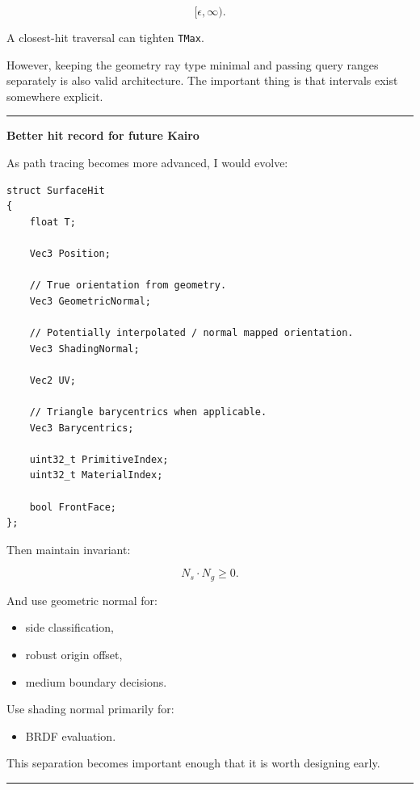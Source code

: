 \[
[\epsilon,\infty).
\]

A closest-hit traversal can tighten \texttt{TMax}.

However, keeping the geometry ray type minimal and passing query ranges separately is also valid architecture. The important thing is that intervals exist somewhere explicit.

\begin{center}\rule{0.5\linewidth}{0.5pt}\end{center}

\textbf{Better hit record for future Kairo}

As path tracing becomes more advanced, I would evolve:

\begin{verbatim}
struct SurfaceHit
{
    float T;

    Vec3 Position;

    // True orientation from geometry.
    Vec3 GeometricNormal;

    // Potentially interpolated / normal mapped orientation.
    Vec3 ShadingNormal;

    Vec2 UV;

    // Triangle barycentrics when applicable.
    Vec3 Barycentrics;

    uint32_t PrimitiveIndex;
    uint32_t MaterialIndex;

    bool FrontFace;
};
\end{verbatim}

Then maintain invariant:

\[
N_s\cdot N_g\ge0.
\]

And use geometric normal for:

\begin{itemize}
\tightlist
\item
  side classification,
\item
  robust origin offset,
\item
  medium boundary decisions.
\end{itemize}

Use shading normal primarily for:

\begin{itemize}
\tightlist
\item
  BRDF evaluation.
\end{itemize}

This separation becomes important enough that it is worth designing early.

\begin{center}\rule{0.5\linewidth}{0.5pt}\end{center}

